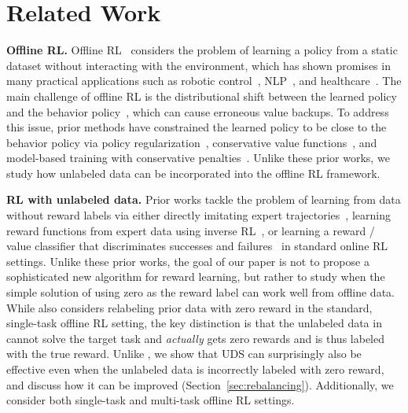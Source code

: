 \section{Related Work}

\textbf{Offline RL.} Offline RL~\citep{ernst2005tree,riedmiller2005neural,LangeGR12,levine2020offline} considers the problem of learning a policy from a static dataset without interacting with the environment, which has shown promises in many practical applications such as robotic control~\citep{kalashnikov2018scalable,Rafailov2020LOMPO}, NLP~\citep{jaques2019way}, 
and healthcare~\citep{shortreed2011informing, Wang2018SupervisedRL}. 
The main challenge of offline RL is the distributional shift between the learned policy and the behavior policy~\citep{fujimoto2018off}, which can cause erroneous value backups. To address this issue, prior methods have constrained the learned policy to be close to the behavior policy via policy regularization~\citep{liu2020provably,wu2019behavior,kumar2019stabilizing, zhou2020plas,ghasemipour2021emaq,fujimoto2021minimalist}, conservative value functions~\citep{kumar2020conservative}, 
and model-based training with conservative penalties~\citep{yu2020mopo,kidambi2020morel,swazinna2020overcoming,lee2021representation,yu2021combo}. Unlike these prior works, we study how unlabeled data can be incorporated into the offline RL framework.

\textbf{RL with unlabeled data.} Prior works tackle the problem of learning from data without reward labels via either directly imitating expert trajectories~\citep{pomerleau1988alvinn,RossB12,GAIL2016Ho}, learning reward functions from expert data using inverse RL~\citep{abbeel2004apprenticeship,ng2000irl,ziebart2008maximum,finn2016guided,AIRLFu2018,konyushkova2020semi}, or learning a reward / value classifier that discriminates successes and failures~\citep{xie2018few,VICEFu2018,singh2019end,eysenbach2021replacing} in standard online RL settings. 
{Unlike these prior works, the goal of our paper is not to propose a sophisticated new algorithm for reward learning,} but rather to study when the simple solution of using zero as the reward label can work well from offline data. {While} \citet{singh2020cog} also considers relabeling prior data with zero reward in the standard, single-task offline RL setting, {the key distinction is that the unlabeled data in \citet{singh2020cog} cannot solve the target task and \emph{actually} gets zero rewards and is thus labeled with the true reward. Unlike \citet{singh2020cog}, we show that UDS can surprisingly also be effective even when the unlabeled data is incorrectly labeled with zero reward, and discuss how it can be improved (Section~\ref{sec:rebalancing}).}
Additionally, we consider both single-task and multi-task offline RL settings.

